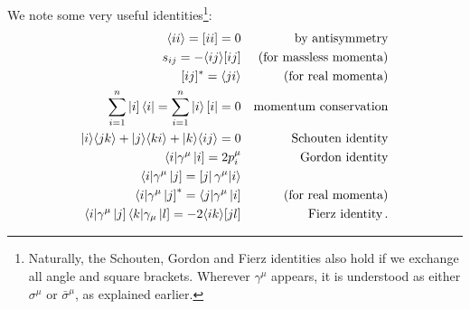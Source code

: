 \documentclass[main.tex]{subfiles}
\begin{document}
We note some very useful identities\footnote{Naturally, the Schouten, Gordon and Fierz identities also hold if we exchange all angle and square brackets. Wherever $\gamma^\mu$ appears, it is understood as either $\sigma^\mu$ or $\bar{\sigma}^\mu$, as explained earlier.}:
\begin{subequations} \label{eq:spinorsids}
    \begin{align}
        \braket{ii} = \braketsq{ii} = 0 && \text{by antisymmetry} \label{eq:iieq0} \\
        s_{ij} = -\braket{ij}\braketsq{ij} && \text{(for massless momenta)} \\
        \braketsq{ij}^{\ast} = \braket{ji} && \text{(for real momenta)} \label{eq:complexconjbracket} \\
        \sum_{i=1}^n \ketsq{i}\bra{i} = \sum_{i=1}^n \ket{i}\brasq{i} = 0 && \text{momentum conservation} \label{eq:spinmomcons}\\
        \ket{i}\braket{jk} + \ket{j}\braket{ki} + \ket{k}\braket{ij} = 0 && \text{Schouten identity} \label{eq:schouten} \\
        \bra{i}\gamma^\mu \ketsq{i} = 2p_i^\mu && \text{Gordon identity} \label{eq:gordon} \\
        \bra{i} \gamma^\mu \ketsq{j} = \brasq{j}\gamma^\mu \ket{i} && \\
        \bra{i}\gamma^\mu \ketsq{j}^{\ast} = \bra{j}\gamma^\mu \ketsq{i} && \text{(for real momenta)} \\
        \bra{i}\gamma^\mu \ketsq{j} \bra{k}\gamma_\mu \ketsq{l} = -2\braket{ik}\braketsq{jl} && \text{Fierz identity} \label{eq:fierz} \,.
    \end{align}

\end{subequations}
\end{document}
